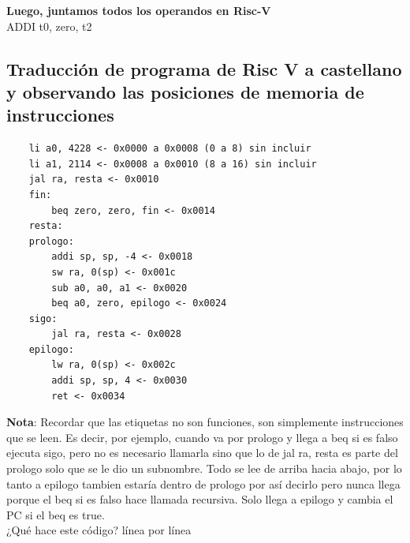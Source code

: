 \documentclass[10pt,a4paper]{article}
\begin{document}
\textbf{Luego, juntamos todos los operandos en Risc-V} \\ 
ADDI t0, zero, t2

\subsection*{Traducción de programa de Risc V a castellano y observando las posiciones de memoria de instrucciones}
\label{subsec:TPRVC}
\begin{lstlisting}
    li a0, 4228 <- 0x0000 a 0x0008 (0 a 8) sin incluir
    li a1, 2114 <- 0x0008 a 0x0010 (8 a 16) sin incluir
    jal ra, resta <- 0x0010
    fin: 
        beq zero, zero, fin <- 0x0014 
    resta: 
    prologo:
        addi sp, sp, -4 <- 0x0018
        sw ra, 0(sp) <- 0x001c
        sub a0, a0, a1 <- 0x0020
        beq a0, zero, epilogo <- 0x0024
    sigo: 
        jal ra, resta <- 0x0028
    epilogo:
        lw ra, 0(sp) <- 0x002c
        addi sp, sp, 4 <- 0x0030
        ret <- 0x0034
\end{lstlisting}
\textbf{Nota}: Recordar que las etiquetas no son funciones, son simplemente instrucciones que se leen. Es decir, por ejemplo, cuando va por prologo y llega a beq si es falso ejecuta sigo, pero no es necesario llamarla sino que lo de jal ra, resta es parte del prologo solo que se le dio un subnombre. Todo se lee de arriba hacia abajo, por lo tanto a epilogo tambien estaría dentro de prologo por así decirlo pero nunca llega porque el beq si es falso hace llamada recursiva. Solo llega a epilogo y cambia el PC si el beq es true. \\ 
¿Qué hace este código? línea por línea
\end{document}
